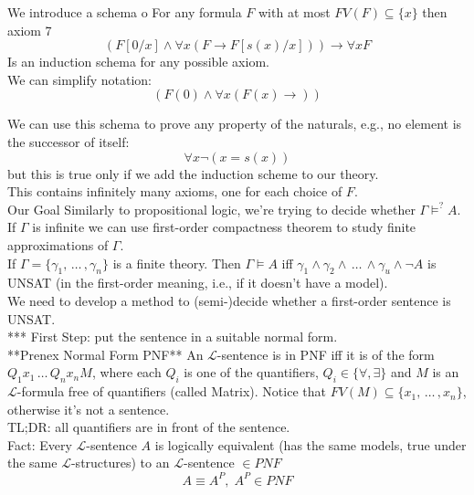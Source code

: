 We introduce a schema o
For any formula $F$ with at most $FV(F) \subseteq \{x\}$ then axiom 7
$$ (F [0/x] \wedge \forall x (F \rightarrow F[s(x)/x])) \rightarrow \forall x F $$
Is an induction schema for any possible axiom.\\
We can simplify notation: 
$$ 
(F(0) \wedge \forall x (F(x) \rightarrow)) %
$$

We can use this schema to prove any property of the naturals, e.g., no element is the successor of itself: 
$$ \forall x \neg (x = s(x)) $$
but this is true only if we add the induction scheme to our theory.\\
This contains infinitely many axioms, one for each choice of $F$.\\

Our Goal
Similarly to propositional logic, we're trying to decide whether $\Gamma \models^? A$.\\

If $\Gamma$ is infinite we can use first-order compactness theorem to study finite approximations of $\Gamma$.\\

If $\Gamma = \{\gamma_1, \, \dots \, , \gamma_n\}$ is a finite theory. Then $\Gamma \models A$ iff $\gamma_1 \wedge \gamma_2 \wedge \, \dots \, \wedge \gamma_u \wedge \neg A$ is UNSAT (in the first-order meaning, i.e., if it doesn't have a model).\\

We need to develop a method to (semi-)decide whether a first-order sentence is UNSAT.\\

***
First Step: put the sentence in a suitable normal form.\\
**Prenex Normal Form PNF**
An $\mathcal{L}$-sentence is in PNF iff it is of the form $Q_1 x_1 \, \dots \, Q_n x_n M$, where each $Q_i$ is one of the quantifiers, $Q_i \in \{\forall, \exists\}$ and $M$ is an $\mathcal{L}$-formula free of quantifiers (called Matrix). Notice that $FV(M) \subseteq \{x_1, \, \dots \, , x_n\}$, otherwise it's not a sentence.\\

TL;DR: all quantifiers are in front of the sentence.\\

Fact: Every $\mathcal{L}$-sentence $A$ is logically equivalent (has the same models, true under the same $\mathcal{L}$-structures) to an $\mathcal{L}$-sentence $\in PNF$
$$ A \equiv A^P, \; A^P \in PNF $$

